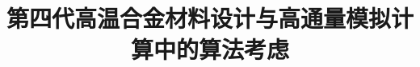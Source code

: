 
\title{第四代高温合金材料设计与高通量模拟计算中的算法考虑}
\author[ ]{}   %
\renewcommand*{\Authfont}{\small\rm} %
\renewcommand*{\Affilfont}{\small\it} %
\renewcommand\Authands{ and } %
\renewcommand\Authands{ , } %
\date{} %


\maketitle

